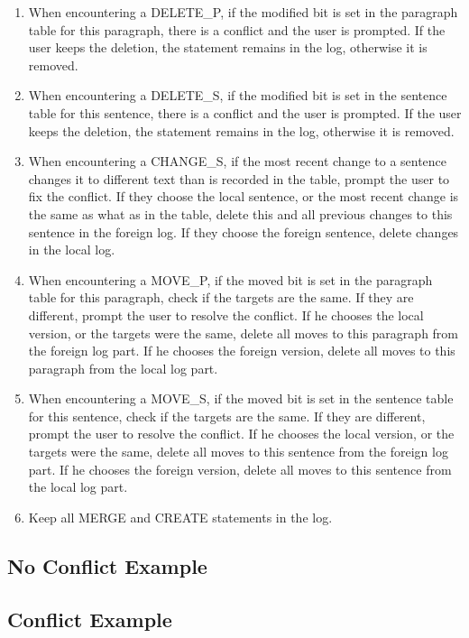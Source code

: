 \begin{enumerate}[1)]

\item When encountering a DELETE\_P, if the modified bit is set in the paragraph table for this paragraph,
      there is a conflict and the user is prompted. If the user keeps the deletion, the
      statement remains in the log, otherwise it is removed.

\item When encountering a DELETE\_S, if the modified bit is set in the sentence table for this sentence,
      there is a conflict and the user is prompted. If the user keeps the deletion, the
      statement remains in the log, otherwise it is removed.

\item When encountering a CHANGE\_S, if the most recent change to a sentence changes it to different text
      than is recorded in the table, prompt the user to fix the conflict. If they choose the local sentence,
      or the most recent change is the same as what as in the table, delete this and all previous changes
      to this sentence in the foreign log. If they choose the foreign sentence, delete changes in the 
      local log.

\item When encountering a MOVE\_P, if the moved bit is set in the paragraph table for this paragraph,
      check if the targets are the same. If they are different, prompt the
      user to resolve the conflict. If he chooses the local version, or the targets were the same, 
      delete all moves to this paragraph
      from the foreign log part. If he chooses the foreign version, delete all moves to this paragraph
      from the local log part.

\item When encountering a MOVE\_S, if the moved bit is set in the sentence table for this sentence,
      check if the targets are the same. If they are different, prompt the
      user to resolve the conflict. If he chooses the local version, or the targets were the same, 
      delete all moves to this sentence 
      from the foreign log part. If he chooses the foreign version, delete all moves to this sentence 
      from the local log part.

\item Keep all MERGE and CREATE statements in the log.
\end{enumerate}

\subsection{No Conflict Example}


\subsection{Conflict Example}








